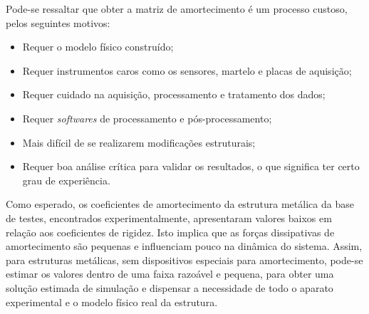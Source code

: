 Pode-se ressaltar que obter a matriz de amortecimento é um processo custoso,
pelos seguintes motivos:
%
\begin{itemize}
  \item Requer o modelo físico construído;
  \item Requer instrumentos caros como os sensores, martelo e placas de
  aquisição;
  \item Requer cuidado na aquisição, processamento e tratamento dos dados;
  \item Requer \textit{softwares} de processamento e pós-processamento;
  \item Mais difícil de se realizarem modificações estruturais;
  \item Requer boa análise crítica para validar os resultados, o que significa
  ter certo grau de experiência.
\end{itemize}
%

Como esperado, os coeficientes de amortecimento da estrutura metálica da base de
testes, encontrados experimentalmente, apresentaram valores baixos em relação
aos coeficientes de rigidez. Isto implica que as forças dissipativas de
amortecimento são pequenas e influenciam pouco na dinâmica do sistema. Assim,
para estruturas metálicas, sem dispositivos especiais para amortecimento,
pode-se estimar os valores dentro de uma faixa razoável e pequena, para obter
uma solução estimada de simulação e dispensar a necessidade de todo o aparato
experimental e o modelo físico real da estrutura.





